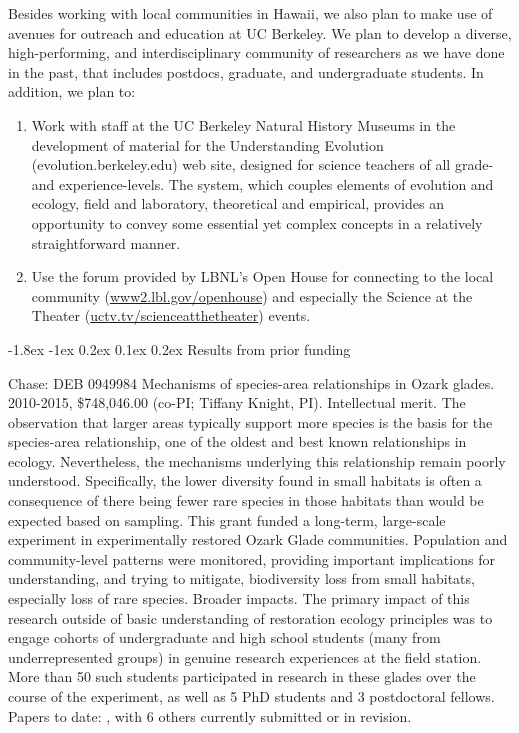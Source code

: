 \documentclass[11pt]{article}
\makeatletter
\renewcommand\section{\@startsection{section}{1}{\z@}%
                                  {-1.8ex \@plus -1ex \@minus 0.2ex}%
                                  {0.1ex \@plus 0.2ex}%
                                  {\normalfont\Large\bfseries}}
\renewcommand{\paragraph}{\@startsection{paragraph}{4}{\z@}
  {1ex \@plus 1ex \@minus .2ex}{-1em}
  {\normalfont\normalsize\it}
}
\makeatother
\begin{document}
Besides working with local communities in Hawaii, we also plan to make
use of avenues for outreach and education at UC Berkeley. We plan to
develop a diverse, high-performing, and interdisciplinary
\citep{cheruvelil2014, goring2014} community of researchers as we have
done in the past, that includes postdocs, graduate, and undergraduate
students. In addition, we plan to:
\begin{enumerate}
\item Work with staff at the UC Berkeley Natural History Museums in
  the development of material for the Understanding Evolution
  (evolution.berkeley.edu) web site, designed for science
  teachers of all grade- and experience-levels. The system, which
  couples elements of evolution and ecology, field and laboratory,
  theoretical and empirical, provides an opportunity to convey some
  essential yet complex concepts in a relatively straightforward
  manner.
\item Use the forum provided by LBNL's Open House for connecting to
  the local community (\url{www2.lbl.gov/openhouse}) and
  especially the Science at the Theater
  (\url{uctv.tv/scienceatthetheater}) events.
\end{enumerate}

\section{Results from prior funding}

\paragraph{Chase:} DEB 0949984 Mechanisms of species-area
relationships in Ozark glades. 2010-2015, \$748,046.00 (co-PI; Tiffany
Knight, PI). Intellectual merit. The observation that larger areas
typically support more species is the basis for the species-area
relationship, one of the oldest and best known relationships in
ecology. Nevertheless, the mechanisms underlying this relationship
remain poorly understood. Specifically, the lower diversity found in
small habitats is often a consequence of there being fewer rare
species in those habitats than would be expected based on
sampling. This grant funded a long-term, large-scale experiment in
experimentally restored Ozark Glade communities. Population and
community-level patterns were monitored, providing important
implications for understanding, and trying to mitigate, biodiversity
loss from small habitats, especially loss of rare species. Broader
impacts. The primary impact of this research outside of basic
understanding of restoration ecology principles was to engage cohorts
of undergraduate and high school students (many from underrepresented
groups) in genuine research experiences at the field station. More
than 50 such students participated in research in these glades over
the course of the experiment, as well as 5 PhD students and 3
postdoctoral fellows. Papers to date: \citep{burkle2012, chase2013,
  powell2013, schuler2015}, with 6 others currently submitted or in
revision.
\end{document}
